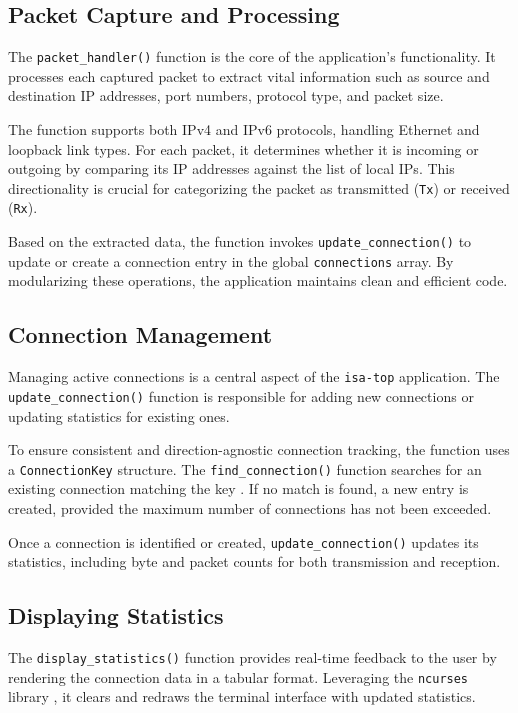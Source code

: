 \documentclass[12pt]{extarticle}
\begin{document}
\subsection{Packet Capture and Processing}

The \texttt{packet\_handler()} function is the core of the application's functionality. It processes each captured packet to extract vital information such as source and destination IP addresses, port numbers, protocol type, and packet size.

The function supports both IPv4 and IPv6 protocols, handling Ethernet and loopback link types. For each packet, it determines whether it is incoming or outgoing by comparing its IP addresses against the list of local IPs. This directionality is crucial for categorizing the packet as transmitted (\texttt{Tx}) or received (\texttt{Rx}).

Based on the extracted data, the function invokes \texttt{update\_connection()} to update or create a connection entry in the global \texttt{connections} array. By modularizing these operations, the application maintains clean and efficient code.

\subsection{Connection Management}

Managing active connections is a central aspect of the \texttt{isa-top} application. The \texttt{update\_connection()} function is responsible for adding new connections or updating statistics for existing ones.

To ensure consistent and direction-agnostic connection tracking, the function uses a \texttt{ConnectionKey} structure. The \texttt{find\_connection()} function searches for an existing connection matching the key \cite{beej}. If no match is found, a new entry is created, provided the maximum number of connections has not been exceeded.

Once a connection is identified or created, \texttt{update\_connection()} updates its statistics, including byte and packet counts for both transmission and reception.

\subsection{Displaying Statistics}

The \texttt{display\_statistics()} function provides real-time feedback to the user by rendering the connection data in a tabular format. Leveraging the \texttt{ncurses} library \cite{ncurses}, it clears and redraws the terminal interface with updated statistics.
\end{document}
